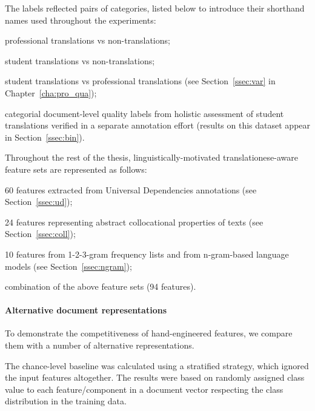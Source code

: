 The labels reflected pairs of categories, listed below to introduce their shorthand names used throughout the experiments:

\begin{description}\compresslist{}
	\item[pro vs ref:] professional translations vs non-translations;
	\item[stu vs ref:] student translations vs non-translations;
	\item[stu vs pro:] student translations vs professional translations (see Section~\ref{ssec:var} in Chapter~\ref{cha:pro_qua});
	\item[bad vs good:] categorial document-level quality labels from holistic assessment of student translations verified in a separate annotation effort (results on this dataset appear in Section~\ref{ssec:bin}).
\end{description}

Throughout the rest of the thesis, linguistically-motivated translationese-aware feature sets are represented as follows:
\begin{description}\compresslist{}
	\item[UD:] 60 features extracted from Universal Dependencies annotations (see Section~\ref{ssec:ud});
	\item[collgram:] 24 features representing abstract collocational properties of texts (see Section~\ref{ssec:coll});
	\item[ngram:] 10 features from 1-2-3-gram frequency lists and from n-gram-based language models (see Section~\ref{ssec:ngram});
	\item[all:] combination of the above feature sets (94 features).
\end{description}  


\paragraph{\label{pg:vectors}Alternative document representations} To demonstrate the competitiveness of hand-engineered features, we compare them with a number of alternative representations. 

The chance-level baseline was calculated using a stratified strategy, which ignored the input features altogether. The results were based on randomly assigned class value to each feature/component in a document vector respecting the class distribution in the training data.


